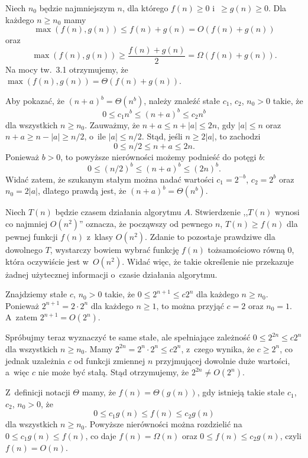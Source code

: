 
\exercise %
Niech $n_0$ będzie najmniejszym $n$, dla którego $f(n)\ge0$ i~$\ge g(n)\ge0$.
Dla każdego $n\ge n_0$ mamy
\[
    \max(f(n),g(n)) \le f(n)+g(n) = O(f(n)+g(n)) \tag{dla $c=1$ w~definicji $O$}
\]
oraz
\[
    \max(f(n),g(n)) \ge \frac{f(n)+g(n)}{2} = \Omega(f(n)+g(n)). \tag{dla $c=1/2$ w~definicji $\Omega$}
\]
Na mocy tw.\ 3.1 otrzymujemy, że $\max(f(n),g(n))=\Theta(f(n)+g(n))$.

\exercise %
Aby pokazać, że $(n+a)^b=\Theta(n^b)$, należy znaleźć stałe $c_1$, $c_2$, $n_0>0$ takie, że
\[
	0 \le c_1n^b \le (n+a)^b \le c_2n^b
\]
dla wszystkich $n\ge n_0$.
Zauważmy, że $n+a\le n+|a|\le2n$, gdy $|a|\le n$ oraz $n+a\ge n-|a|\ge n/2$, o~ile $|a|\le n/2$.
Stąd, jeśli $n\ge 2|a|$, to zachodzi
\[
	0 \le n/2 \le n+a \le 2n.
\]
Ponieważ $b>0$, to powyższe nierówności możemy podnieść do potęgi $b$:
\[
	0 \le (n/2)^b \le (n+a)^b \le (2n)^b.
\]
Widać zatem, że szukanym stałym można nadać wartości $c_1=2^{-b}$, $c_2=2^b$ oraz $n_0=2|a|$, dlatego prawdą jest, że $(n+a)^b=\Theta(n^b)$.

\exercise %
Niech $T(n)$ będzie czasem działania algorytmu $A$.
Stwierdzenie ,,$T(n)$ wynosi co najmniej $O(n^2)$'' oznacza, że począwszy od pewnego $n$, $T(n)\ge f(n)$ dla pewnej funkcji $f(n)$ z~klasy $O(n^2)$.
Zdanie to pozostaje prawdziwe dla dowolnego $T$, wystarczy bowiem wybrać funkcję $f(n)$ tożsamościowo równą 0, która oczywiście jest w~$O(n^2)$.
Widać więc, że takie określenie nie przekazuje żadnej użytecznej informacji o~czasie działania algorytmu.

\exercise %
Znajdziemy stałe $c$, $n_0>0$ takie, że $0\le2^{n+1}\le c2^n$ dla każdego $n\ge n_0$.
Ponieważ $2^{n+1}=2\cdot2^n$ dla każdego $n\ge1$, to można przyjąć $c=2$ oraz $n_0=1$.
A~zatem $2^{n+1}=O(2^n)$.

Spróbujmy teraz wyznaczyć te same stałe, ale spełniające zależność $0\le2^{2n}\le c2^n$ dla wszystkich $n\ge n_0$.
Mamy $2^{2n}=2^n\cdot2^n\le c2^n$, z~czego wynika, że $c\ge2^n$, co jednak uzależnia $c$ od funkcji zmiennej $n$ przyjmującej dowolnie duże wartości, a~więc $c$ nie może być stałą.
Stąd otrzymujemy, że $2^{2n}\ne O(2^n)$.

\exercise %
Z~definicji notacji $\Theta$ mamy, że $f(n)=\Theta(g(n))$, gdy istnieją takie stałe $c_1$, $c_2$, $n_0>0$, że
\[
	0 \le c_1g(n) \le f(n) \le c_2g(n)
\]
dla wszystkich $n\ge n_0$.
Powyższe nierówności można rozdzielić na $0\le c_1g(n)\le f(n)$, co daje $f(n)=\Omega(n)$ oraz $0\le f(n)\le c_2g(n)$, czyli $f(n)=O(n)$.

